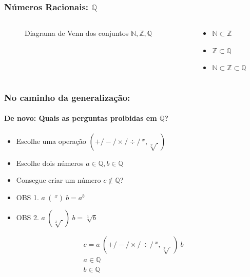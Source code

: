\documentclass[usenames,dvipsnames,svgnames]{beamer}
\begin{document}
\begin{frame}	
	\frametitle{Números Racionais: $\mathbb{Q}$}

	\begin{columns}[t]
	\begin{column}{.4\textwidth}
		\begin{figure}
			\def\Ncircle{		(0,0) circle (0.5cm)}
			\def\Zcircle{		(0,0) circle (1.5cm)}
			\def\Qcircle{		(0,0) circle (2.5cm)}

			\caption{Diagrama de Venn dos conjuntos $\mathbb{N}, \mathbb{Z}, \mathbb{Q}$}
		\end{figure}
	\end{column}
	\begin{column}{.6\textwidth}
		\begin{itemize}
			\item $\mathbb{N} \subset \mathbb{Z}$
			\item $\mathbb{Z} \subset \mathbb{Q}$
			\item $\mathbb{N} \subset \mathbb{Z} \subset \mathbb{Q}$
		\end{itemize}
	\end{column}
	\end{columns}
\end{frame}

\begin{frame}	
	\frametitle{No caminho da generalização:}
	\framesubtitle{De novo: Quais as perguntas proibidas em $\mathbb{Q}$?}

	\begin{itemize}
		\item Escolhe uma operação $(+ / - / \times / \div / ~^x, \sqrt[x]{~})$
		\item Escolhe dois números $a \in \mathbb{Q}, b \in \mathbb{Q}$
		\item Consegue criar um número $c \not \in \mathbb{Q}$?
		\item OBS 1. $a ~(~^x)~ b = a^b$
		\item OBS 2. $a ~(\sqrt[x]{~})~ b = \sqrt[a]{b}$
	\end{itemize}

	\begin{equation}
	\begin{aligned}
		c = a ~ (+ / - / \times / \div / ~^x, \sqrt[x]{~}) ~ b \\
		a \in \mathbb{Q} \\
		b \in \mathbb{Q}
	\end{aligned}
	\end{equation}
\end{frame}
\end{document}
